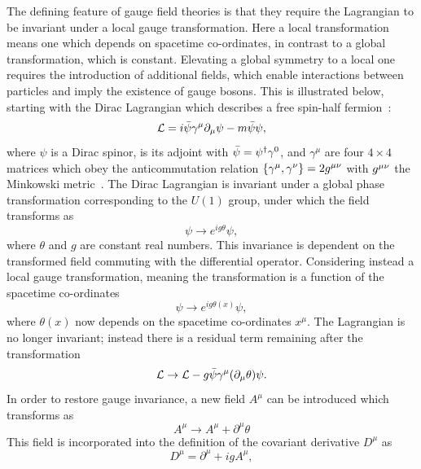 The defining feature of gauge field theories is that they require the Lagrangian 
to be invariant under a local gauge transformation.
Here a local transformation means one which depends on spacetime co-ordinates, 
in contrast to a global transformation, which is constant.
Elevating a global symmetry to a local one requires the introduction of additional fields, 
which enable interactions between particles and imply the existence of gauge bosons.
This is illustrated below, starting with the Dirac Lagrangian 
which describes a free spin-half fermion~\cite{Dirac,Griffiths}:
\begin{equation}
\mathcal{L} = i \bar{\psi} \gamma^\mu \partial_\mu \psi - m\bar{\psi}\psi ,
\end{equation}
where $\psi$ is a Dirac spinor, \psibar is its adjoint with $\bar{\psi} = \psi^\dagger \gamma^0$, 
and $\gamma^\mu$ are four $4\times4$ matrices which obey the anticommutation relation
$\{\gamma^\mu,\gamma^\nu\} = 2g^{\mu\nu}$ with $g^{\mu\nu}$ the Minkowski metric~\cite{Griffiths}.
The Dirac Lagrangian is invariant under a global phase transformation 
corresponding to the $U(1)$ group, under which the field transforms as
\begin{equation}
\psi \rightarrow e^{ig\theta} \psi ,
\end{equation}
where $\theta$ and $g$ are constant real numbers.
This invariance is dependent on the transformed field commuting with the differential operator. 
Considering instead a local gauge transformation, 
meaning the transformation is a function of the spacetime co-ordinates
\begin{equation}
\psi \rightarrow e^{ig\theta(x)} \psi , 
\end{equation}
where $\theta(x)$ now depends on the spacetime co-ordinates $x^\mu$.
The Lagrangian is no longer invariant;
instead there is a residual term remaining after the transformation
\begin{equation}
\mathcal{L} \rightarrow \mathcal{L} - g \bar{\psi} \gamma^\mu (\partial_\mu \theta) \psi .
\end{equation}
In order to restore gauge invariance, a new field $A^{\mu}$ can be introduced 
which transforms as
\begin{equation}
A^\mu \rightarrow A^\mu + \partial^\mu \theta
\end{equation}
This field is incorporated into the definition of the covariant derivative $D^\mu$ as
\begin{equation}
\label{eq:theory_covdev}
D^\mu = \partial^\mu + i g A^\mu , 
\end{equation}
